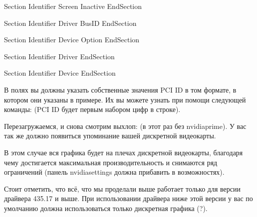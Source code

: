 \documentclass[letterpaper,10pt,russian,openany]{sphinxmanual}
\begin{document}
\begin{sphinxVerbatim}[commandchars=\\\{\}]
Section 
  Identifier 
  Screen  
  Inactive 
EndSection

Section 
    Identifier  
    Driver      
    BusID        
EndSection

Section 
    Identifier 
    Device 
    Option 
EndSection

Section 
    Identifier  
    Driver      
EndSection

Section 
    Identifier 
    Device 
EndSection
\end{sphinxVerbatim}

\sphinxAtStartPar
В полях  вы должны указать собственные значения PCI ID в том формате, в котором они указаны в примере.
Их вы можете узнать при помощи следующей команды:  (PCI ID будет первым набором цифр в строке).

\sphinxAtStartPar
Перезагружаемся, и снова смотрим выхлоп: 
(в этот раз без nvidia\sphinxhyphen{}prime). У вас так же должно появиться упоминание
вашей дискретной видеокарты.

\sphinxAtStartPar
В этом случае вся графика будет на плечах дискретной видеокарты, благодаря
чему достигается максимальная производительность и снимаются ряд ограничений
(панель nvidia\sphinxhyphen{}settings должна прибавить в возможностях).

\sphinxAtStartPar
Стоит отметить, что всё, что мы проделали выше \sphinxhyphen{} работает только для версии драйвера 435.17 и выше.
При использовании драйвера ниже этой версии у вас по умолчанию должна использоваться только дискретная графика (?).
\end{document}

